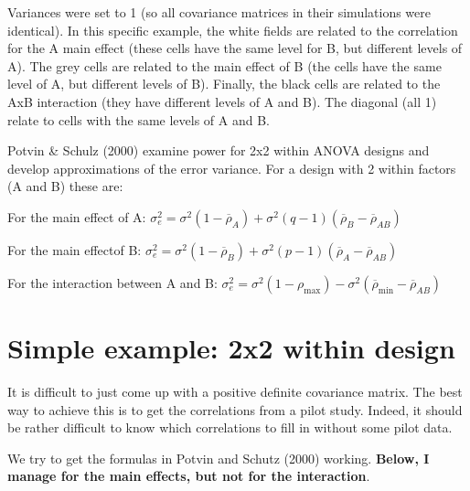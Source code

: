\documentclass[]{book}
\begin{document}
Variances were set to 1 (so all covariance matrices in their simulations were identical). In this specific example, the white fields are related to the correlation for the A main effect (these cells have the same level for B, but different levels of A). The grey cells are related to the main effect of B (the cells have the same level of A, but different levels of B). Finally, the black cells are related to the AxB interaction (they have different levels of A and B). The diagonal (all 1) relate to cells with the same levels of A and B.

Potvin \& Schulz (2000) examine power for 2x2 within ANOVA designs and develop approximations of the error variance. For a design with 2 within factors (A and B) these are:

For the main effect of A:
\(\sigma _ { e } ^ { 2 } = \sigma ^ { 2 } ( 1 - \overline { \rho } _ { A } ) + \sigma ^ { 2 } ( q - 1 ) ( \overline { \rho } _ { B } - \overline { \rho } _ { AB } )\)

For the main effectof B:
\(\sigma _ { e } ^ { 2 } = \sigma ^ { 2 } ( 1 - \overline { \rho } _ { B } ) + \sigma ^ { 2 } ( p - 1 ) ( \overline { \rho } _ { A } - \overline { \rho } _ { A B } )\)

For the interaction between A and B:
\(\sigma _ { e } ^ { 2 } = \sigma ^ { 2 } ( 1 - \rho _ { \max } ) - \sigma ^ { 2 } ( \overline { \rho } _ { \min } - \overline { \rho } _ { AB } )\)

\hypertarget{simple-example-2x2-within-design}{%
\section{Simple example: 2x2 within design}\label{simple-example-2x2-within-design}}

It is difficult to just come up with a positive definite covariance matrix. The best way to achieve this is to get the correlations from a pilot study. Indeed, it should be rather difficult to know which correlations to fill in without some pilot data.

We try to get the formulas in Potvin and Schutz (2000) working. \textbf{Below, I manage for the main effects, but not for the interaction}.
\end{document}
